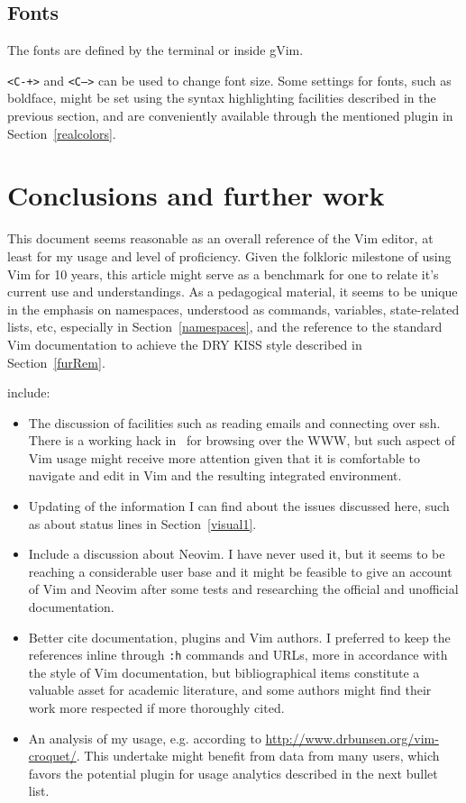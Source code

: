 \documentclass{article}
\newcommand{\ttt}[1] {
	\texttt{<#1>}}
\newcommand{\tttt}[1]{\texttt{#1}}
\begin{document}
\subsection{Fonts}
The fonts are defined by the terminal or inside gVim.
\ttt{C-+} and \ttt{C--} can be used to change font size.
Some settings for fonts, such as boldface, might be set using
the syntax highlighting facilities described in the previous section,
and are conveniently available through the mentioned plugin in Section~\ref{realcolors}.

\section{Conclusions and further work}\label{conc}
This document seems reasonable as an overall reference of the Vim editor,
at least for my usage and level of proficiency.
Given the folkloric milestone of using Vim for 10 years,
this article might serve as a benchmark for one to relate
it's current use and understandings.
As a pedagogical material, it seems to be unique in the emphasis
on namespaces, understood as commands, variables, state-related lists, etc,
especially in Section~\ref{namespaces},
and the reference to the standard Vim documentation
to achieve the DRY KISS style described in Section~\ref{furRem}.

 include:
\begin{itemize}
  \item The discussion of facilities such as reading emails and connecting over ssh.
    There is a working hack in~\cite{vimrc} for browsing over the WWW,
    but such aspect of Vim usage might receive more attention
    given that it is comfortable to navigate and edit in Vim
    and the resulting integrated environment.
  \item Updating of the information I can find about the issues discussed here,
    such as about status lines in Section~\ref{visual1}.
  \item Include a discussion about Neovim.
    I have never used it, but it seems to be reaching a considerable user base
    and it might be feasible to give an account of Vim and Neovim
    after some tests and researching the official and unofficial documentation.
  \item Better cite documentation, plugins and Vim authors.
    I preferred to keep the references inline through \tttt{:h} commands
    and URLs, more in accordance with the style of Vim documentation,
    but bibliographical items constitute a valuable asset for academic literature,
    and some authors might find their work more respected if more
    thoroughly cited.
  \item An analysis of my usage, e.g. according to \url{http://www.drbunsen.org/vim-croquet/}.
    This undertake might benefit from data from many users,
    which favors the potential plugin for usage analytics described in the next bullet list.
\end{itemize}
\end{document}
